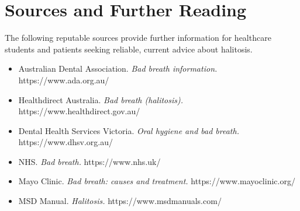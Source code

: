 \section*{Sources and Further Reading}
The following reputable sources provide further information for healthcare students and patients seeking reliable, current advice about halitosis.

\begin{itemize}
    \item Australian Dental Association. \textit{Bad breath information.} https://www.ada.org.au/
    \item Healthdirect Australia. \textit{Bad breath (halitosis).} https://www.healthdirect.gov.au/
    \item Dental Health Services Victoria. \textit{Oral hygiene and bad breath.} https://www.dhsv.org.au/
    \item NHS. \textit{Bad breath.} https://www.nhs.uk/
    \item Mayo Clinic. \textit{Bad breath: causes and treatment.} https://www.mayoclinic.org/
    \item MSD Manual. \textit{Halitosis.} https://www.msdmanuals.com/
\end{itemize}
